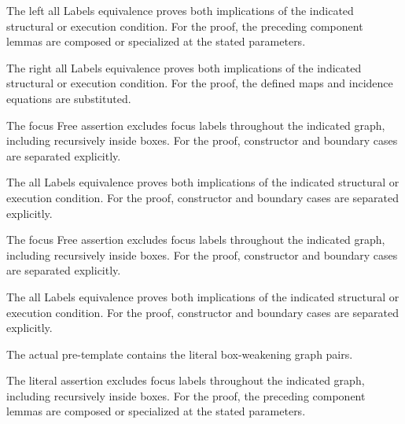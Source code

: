 The left all Labels equivalence proves both implications of the indicated structural or execution condition.
For the proof, the preceding component lemmas are composed or specialized at the stated parameters.
\par{}

The right all Labels equivalence proves both implications of the indicated structural or execution condition.
For the proof, the defined maps and incidence equations are substituted.
\par{}

The focus Free assertion excludes focus labels throughout the indicated graph, including recursively inside boxes.
For the proof, constructor and boundary cases are separated explicitly.
\par{}

The all Labels equivalence proves both implications of the indicated structural or execution condition.
For the proof, constructor and boundary cases are separated explicitly.
\par{}

The focus Free assertion excludes focus labels throughout the indicated graph, including recursively inside boxes.
For the proof, constructor and boundary cases are separated explicitly.
\par{}

The all Labels equivalence proves both implications of the indicated structural or execution condition.
For the proof, constructor and boundary cases are separated explicitly.
\par{}

The actual pre-template contains the literal box-weakening graph pairs.
\par{}

The literal assertion excludes focus labels throughout the indicated graph, including recursively inside boxes.
For the proof, the preceding component lemmas are composed or specialized at the stated parameters.
\par{}

